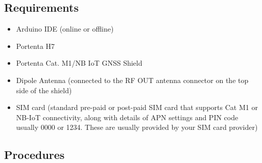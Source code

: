 \subsection{Requirements}
\begin{itemize}
	\item Arduino IDE (online or offline)
	\item Portenta H7
	\item Portenta Cat. M1/NB IoT GNSS Shield
	\item Dipole Antenna (connected to the RF OUT antenna connector on the top side of the shield)
	\item SIM card (standard pre-paid or post-paid SIM card that supports Cat M1 or NB-IoT connectivity, along with details of APN settings and PIN code usually 0000 or 1234. These are usually provided by your SIM card provider)
\end{itemize}

\subsection{Procedures}

